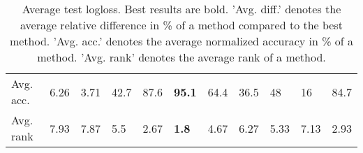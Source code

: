 \begin{table}[ht!]
\begin{tabular}{lllllllllll}
  Avg. acc. & 6.26 & 3.71 & 42.7 & 87.6 & \textbf{95.1} & 64.4 & 36.5 & 48 & 16 & 84.7 \\ 
  Avg. rank & 7.93 & 7.87 & 5.5 & 2.67 & \textbf{1.8} & 4.67 & 6.27 & 5.33 & 7.13 & 2.93 \\ 
   \hline
\hline
\end{tabular}
\endgroup
\caption{Average test logloss. 
                  Best results are bold. 
                  'Avg. diff.' denotes the average relative difference in \% of a method compared to the best method.
                  'Avg. acc.' denotes the average normalized accuracy in \% of a method.
                  'Avg. rank' denotes the average rank of a method.} 
\label{TABLES/table_results_logloss_mahalanobis}
\end{table}
